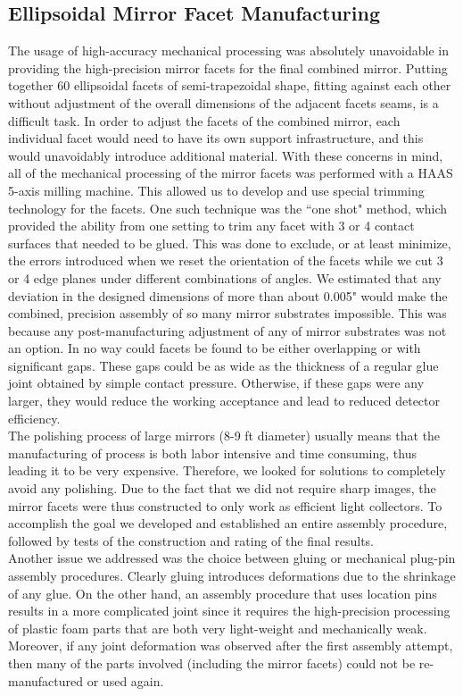 \subsection {Ellipsoidal Mirror Facet Manufacturing}
\indent The usage of high-accuracy mechanical processing was absolutely unavoidable in providing the high-precision mirror facets for the final combined mirror. Putting together 60 ellipsoidal facets of semi-trapezoidal shape, fitting against each other without adjustment of the overall dimensions of the adjacent facets seams, is a difficult task. In order to adjust the facets of the combined mirror, each individual facet would need to have its own support infrastructure, and this would unavoidably introduce additional material. With these concerns in mind, all of the mechanical processing of the mirror facets was performed with a HAAS 5-axis milling machine. This allowed us to develop and use special trimming technology for the facets. One such technique was the ``one shot" method, which provided the ability from one setting to trim any facet with 3 or 4 contact surfaces that needed to be glued. This was done to exclude, or at least minimize, the errors introduced when we reset the orientation of the facets while we cut 3 or 4 edge planes under different combinations of angles. We estimated that any deviation in the designed dimensions of more than about 0.005" would make the combined, precision assembly of so many mirror substrates impossible. This was because any post-manufacturing adjustment of any of mirror substrates was not an option. In no way could facets be found to be either overlapping or with significant gaps. These gaps could be as wide as the thickness of a regular glue joint obtained by simple contact pressure. Otherwise, if these gaps were any larger, they would reduce the working acceptance and lead to reduced detector efficiency.
\\
\indent The polishing process of large mirrors (8-9 ft diameter) usually means that the manufacturing of process is both labor intensive and time consuming, thus leading it to be very expensive. Therefore, we looked for solutions to completely avoid any polishing. Due to the fact that we did not require sharp images, the mirror facets were thus constructed to only work as efficient light collectors. To accomplish the goal we developed and established an entire assembly procedure, followed by tests of the construction and rating of the final results.
\\
\indent Another issue we addressed was the choice between gluing or mechanical plug-pin assembly procedures. Clearly gluing introduces deformations due to the shrinkage of any glue. On the other hand, an assembly procedure that uses location pins results in a more complicated joint since it requires the high-precision processing of plastic foam parts that are both very light-weight and mechanically weak. Moreover, if any joint deformation was observed after the first assembly attempt, then many of the parts involved (including the mirror facets) could not be re-manufactured or used again.
